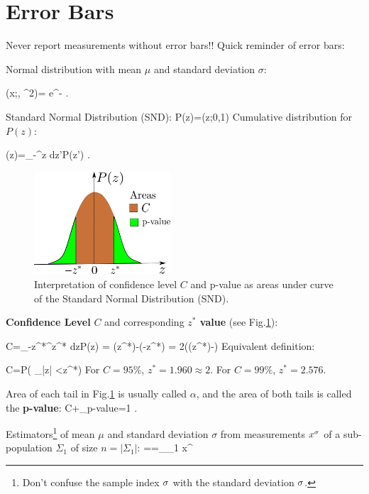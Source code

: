 \section{Error Bars}
Never report measurements without error bars!!
Quick reminder of error bars:

Normal distribution
with mean $\mu$
and standard deviation $\sigma$:

\beq
\caln(x;\mu, \s^2)=
e^{- }
\;.
\eeq

Standard Normal Distribution (SND):
\beq
P(z)=\caln(z;0,1)
\eeq
Cumulative distribution for $P(z)$:

\beq
\Phi(z)=\int_{-\infty}^z dz'\;P(z')
\;.
\eeq

\begin{figure}[h!]
\centering
\includegraphics[width=2in]
{conventions/error-bars.png}
\caption{
Interpretation
of confidence level $C$
and p-value as areas under curve of the
Standard Normal Distribution (SND).} 
\label{fig-error-bars}
\end{figure}

{\bf Confidence Level} $C$
and corresponding {\bf $z^*$ value}
(see Fig.\ref{fig-error-bars}):

\beq
C=\int_{-z^*}^{z^*} dz\;P(z) = 
\Phi(z^*)-\Phi(-z^*)
=
2\left(\Phi(z^*)-\right)
\label{eq-conf-level1}
\eeq
Equivalent definition:

\beq
C=P\left(
_{|z|}
<z^*\right)
\label{eq-conf-level2}
\eeq
For $C=95\%$,
$z^*=1.960\approx 2$.
For $C=99\%$, $z^*=2.576$.

Area of each tail 
in Fig.\ref{fig-error-bars} is
usually called $\alpha$,
and the area of both tails is called
the {\bf p-value}:
\beq
C+\underbrace{2\alpha}_{p-value}=1
\;.
\eeq  

Estimators\footnote{Don't 
confuse the sample index $\sigma$
with the standard deviation $\sigma$.} of 
mean $\mu$  and 
standard deviation $\sigma$
from measurements $x^\sigma$
of a sub-population $\Sigma_1$ of
size $n=|\Sigma_1|$:
\beq
\hat{\mu}==\sum_{\s \in\Sigma_1} x^\s
\eeq


